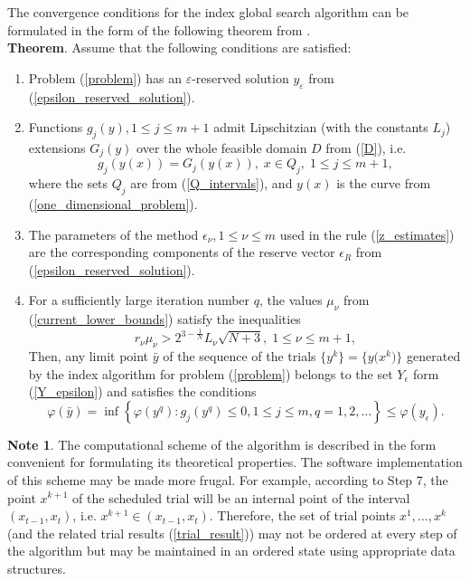 \documentclass[review]{elsarticle}
\begin{document}
	The convergence conditions for the index global search algorithm can be formulated in the form of the following theorem from \cite{Strongin2000}. 
\\
\textbf{Theorem}. Assume that the following conditions are satisfied:
\begin{enumerate} 
  \item Problem (\ref{problem}) has an $\varepsilon$-reserved solution $y_{\varepsilon}$ from (\ref{epsilon_reserved_solution}).
  \item Functions $g_j(y), 1 \leq j \leq m+1$ admit Lipschitzian (with the constants $L_j$) extensions $G_{j}(y)$ over the whole feasible domain $D$ from (\ref{D}), i.e.
$$
	g_j \left( y(x) \right) = G_j \left( y(x) \right), \; x \in Q_j, \; 1 \leq j \leq m+1,
$$
where the sets $Q_j$ are from (\ref{Q_intervals}), and $y(x)$ is the curve from (\ref{one_dimensional_problem}).
	\item The parameters of the method $\epsilon_{\nu}, 1 \leq \nu \leq m$ used in the rule (\ref{z_estimates}) are the corresponding components of the reserve vector $\epsilon_{R}$ from (\ref{epsilon_reserved_solution}).
	\item For a sufficiently large iteration number $q$, the values $\mu_{\nu}$ from (\ref{current_lower_bounds}) satisfy the inequalities
		\begin{equation}\label{theorem_inequalities}
			r_{\nu}\mu_{\nu} > 2^{3-\frac{1}{N}}L_{\nu}\sqrt{N+3}, \; 1 \leq \nu \leq m+1, 
		\end{equation}
Then, any limit point $\bar{y}$ of the sequence of the trials $\{y^k\}=\big\{y\big(x^k\big)\big\}$ generated by the index algorithm for problem (\ref{problem}) belongs to the set $Y_{\epsilon}$ form (\ref{Y_epsilon}) and satisfies the conditions	
$$
	\varphi(\bar y) = \inf\left\{\varphi(y^q):g_j(y^q) \leq 0, 1 \leq j \leq m, q = 1,2,\ldots \right\} \leq \varphi(y_{\epsilon}).
$$
\end{enumerate}
\textbf{Note 1}. The computational scheme of the algorithm is described in the form convenient for  formulating its theoretical properties. The software implementation of this scheme may be made more frugal. For example, according to Step 7, the point $x^{k+1}$ of the scheduled trial will be an internal point of the interval $(x_{t-1}, x_t)$, i.e. $x^{k+1} \in (x_{t-1}, x_t)$. Therefore, the set of trial points $x^1,\ldots, x^k$ (and the related trial results (\ref{trial_result})) may not be ordered  at every step of the algorithm but may be maintained in an ordered state using appropriate data structures.
\end{document}

